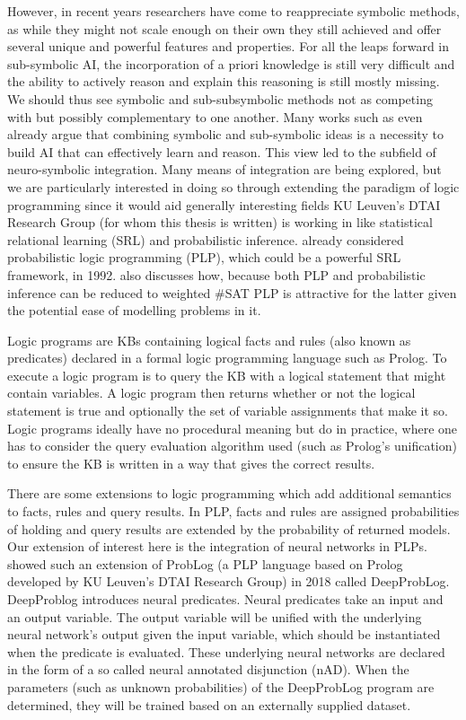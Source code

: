 However, in recent years researchers have come to reappreciate symbolic methods, as while they might not scale enough on their own they still achieved and offer several unique and powerful features and properties. For all the leaps forward in sub-symbolic AI, the incorporation of a priori knowledge is still very difficult and the ability to actively reason and explain this reasoning is still mostly missing. We should thus see symbolic and sub-subsymbolic methods not as competing with but possibly complementary to one another. Many works such as \cite{garcez2015neural} even already argue that combining symbolic and sub-symbolic ideas is a necessity to build AI that can effectively learn and reason. This view led to the subfield of neuro-symbolic integration. Many means of integration are being explored, but we are particularly interested in doing so through extending the paradigm of logic programming since it would aid generally interesting fields KU Leuven's DTAI Research Group (for whom this thesis is written) is working in like statistical relational learning (SRL) and probabilistic inference. \cite{ng1992probabilistic} already considered probabilistic logic programming (PLP), which could be a powerful SRL framework, in 1992. \cite{fierens2015inference} also discusses how, because both PLP and probabilistic inference can be reduced to weighted \#SAT PLP is attractive for the latter given the potential ease of modelling problems in it. \par
Logic programs are KBs containing logical facts and rules (also known as predicates) declared in a formal logic programming language such as Prolog. To execute a logic program is to query the KB with a logical statement that might contain variables. A logic program then returns whether or not the logical statement is true and optionally the set of variable assignments that make it so. Logic programs ideally have no procedural meaning but do in practice, where one has to consider the query evaluation algorithm used (such as Prolog's unification) to ensure the KB is written in a way that gives the correct results. \par
There are some extensions to logic programming which add additional semantics to facts, rules and query results. In PLP, facts and rules are assigned probabilities of holding and query results are extended by the probability of returned models. Our extension of interest here is the integration of neural networks in PLPs. \cite{manhaeve2018deepproblog} showed such an extension of ProbLog (a PLP language based on Prolog developed by KU Leuven's DTAI Research Group) in 2018 called DeepProbLog. DeepProblog introduces neural predicates. Neural predicates take an input and an output variable. The output variable will be unified with the underlying neural network's output given the input variable, which should be instantiated when the predicate is evaluated. These underlying neural networks are declared in the form of a so called neural annotated disjunction (nAD). When the parameters (such as unknown probabilities) of the DeepProbLog program are determined, they will be trained based on an externally supplied dataset. \par
